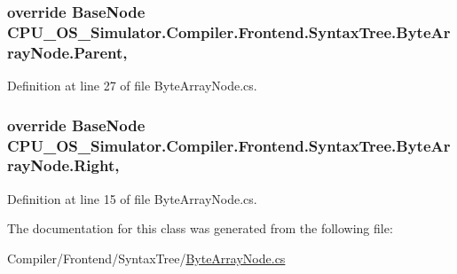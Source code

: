 \subsubsection[{Parent}]{\setlength{\rightskip}{0pt plus 5cm}override {\bf Base\+Node} C\+P\+U\+\_\+\+O\+S\+\_\+\+Simulator.\+Compiler.\+Frontend.\+Syntax\+Tree.\+Byte\+Array\+Node.\+Parent\hspace{0.3cm}{\ttfamily [get]}, {\ttfamily [set]}}\label{class_c_p_u___o_s___simulator_1_1_compiler_1_1_frontend_1_1_syntax_tree_1_1_byte_array_node_a6b1a860628d31271a0985ac13f1b797b}


Definition at line 27 of file Byte\+Array\+Node.\+cs.

\hypertarget{class_c_p_u___o_s___simulator_1_1_compiler_1_1_frontend_1_1_syntax_tree_1_1_byte_array_node_a4e51f2ddd2a095fe9fa84cfb1fa2e6bc}{}
\subsubsection[{Right}]{\setlength{\rightskip}{0pt plus 5cm}override {\bf Base\+Node} C\+P\+U\+\_\+\+O\+S\+\_\+\+Simulator.\+Compiler.\+Frontend.\+Syntax\+Tree.\+Byte\+Array\+Node.\+Right\hspace{0.3cm}{\ttfamily [get]}, {\ttfamily [set]}}\label{class_c_p_u___o_s___simulator_1_1_compiler_1_1_frontend_1_1_syntax_tree_1_1_byte_array_node_a4e51f2ddd2a095fe9fa84cfb1fa2e6bc}


Definition at line 15 of file Byte\+Array\+Node.\+cs.



The documentation for this class was generated from the following file\+:\begin{DoxyCompactItemize}
\item 
Compiler/\+Frontend/\+Syntax\+Tree/\hyperlink{_byte_array_node_8cs}{Byte\+Array\+Node.\+cs}\end{DoxyCompactItemize}
